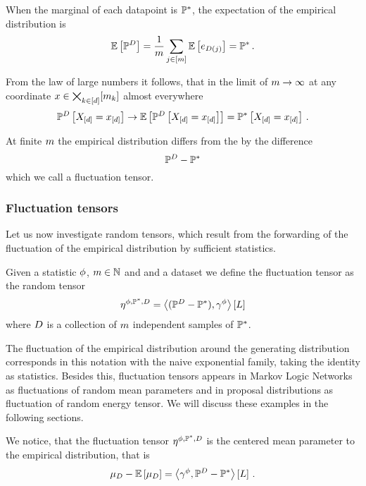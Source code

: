 When the marginal of each datapoint is $\mathbb{P}^*$, the expectation of the empirical distribution is
\begin{align*}
	\mathbb{E}\left[\mathbb{P}^{D}\right] 
	= \frac{1}{m} \sum_{j\in[m]}  \mathbb{E}\left[e_{D(j)}\right]
	= \mathbb{P}^* \, . 
\end{align*}

From the law of large numbers it follows, that in the limit of $m\rightarrow\infty$ at any coordinate $x\in\bigtimes_{k\in[d]}[m_{k}]$ almost everywhere
	\[ \mathbb{P}^{D}\left[X_{[d]}=x_{[d]}\right] \rightarrow \mathbb{E}\left[\mathbb{P}^{D}\left[X_{[d]}=x_{[d]}\right]\right] =  \mathbb{P}^*\left[X_{[d]}=x_{[d]}\right] \, . \]

At finite $m$ the empirical distribution differs from the by the difference
	\[ \mathbb{P}^{D} - \mathbb{P}^* \]
which we call a fluctuation tensor.


\subsubsection{Fluctuation tensors}

Let us now investigate random tensors, which result from the forwarding of the fluctuation of the empirical distribution by sufficient statistics.

\begin{definition}
	Given a statistic $\phi$, $m\in\mathbb{N}$ and and a dataset we define the fluctuation tensor as the random tensor
		\[ \eta^{\phi,\mathbb{P}^*,D} = \left\langle (\mathbb{P}^{D}-\mathbb{P}^*),\gamma^{\phi}\right\rangle \left[ L \right] \]
	where $D$ is a collection of $m$ independent samples of $\mathbb{P}^*$.
\end{definition}

The fluctuation of the empirical distribution around the generating distribution corresponds in this notation with the naive exponential family, taking the identity as statistics.
Besides this, fluctuation tensors appears in Markov Logic Networks as fluctuations of random mean parameters and in proposal distributions as fluctuation of random energy tensor.
We will discuss these examples in the following sections.


We notice, that the fluctuation tensor $\eta^{\phi,\mathbb{P}^*,D}$ is the centered mean parameter to the empirical distribution, that is
\begin{align*}
	\mu_{D} - \mathbb{E}\left[\mu_{D}\right] =  \left\langle \gamma^{\phi},\mathbb{P}^{D}-\mathbb{P}^*\right\rangle \left[ L \right] \, . 
\end{align*}


